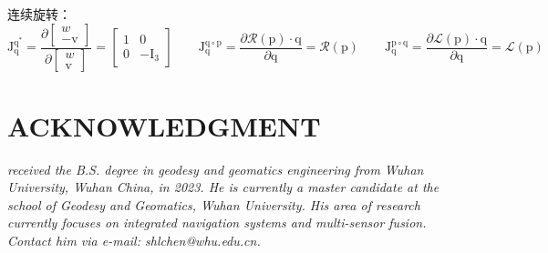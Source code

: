 \documentclass[12pt, onecolumn]{article}
\newcommand\bsm[1]{\boldsymbol{\mathrm{#1}}}
\begin{document}
	连续旋转：
	\begin{equation}
	\bsm{J}^{\bsm{q}^{*}}_{\bsm{q}}=
	\frac{\partial \begin{bmatrix}
	w\\-\bsm{v}
	\end{bmatrix}}{\partial \begin{bmatrix}
		w\\\bsm{v}
		\end{bmatrix}}=\begin{bmatrix}
		1&\bsm{0}\\
		\bsm{0}&-\bsm{I}_3
		\end{bmatrix}
	\qquad
	\bsm{J}^{\bsm{q}\circ\bsm{p}}_{\bsm{q}}=
	\frac{\partial \mathcal{R}(\bsm{p})\cdot\bsm{q}}{\partial \bsm{q}}=\mathcal{R}(\bsm{p})
	\qquad
	\bsm{J}^{\bsm{p}\circ\bsm{q}}_{\bsm{q}}=
	\frac{\partial \mathcal{L}(\bsm{p})\cdot\bsm{q}}{\partial \bsm{q}}=\mathcal{L}(\bsm{p})
	\end{equation}
	
	
	
	
	\newpage
	
	
		
	\newpage
	\section*{ACKNOWLEDGMENT}
	\begin{tcolorbox}[colback=white,colframe=white!70!black,title={\bfseries Author Information}]
	\par\noindent
		\parbox[t]{\linewidth}{
	 \noindent{}
	 \emph{
	 received the B.S. degree in geodesy and geomatics engineering from Wuhan University, Wuhan China, in 2023.
	 He is currently a master candidate at the school of Geodesy and Geomatics, Wuhan University. His area of research currently focuses on integrated navigation systems and multi-sensor fusion.
	 Contact him via e-mail: shlchen@whu.edu.cn.
	 }}
	\end{tcolorbox}
		
		
\end{document}
